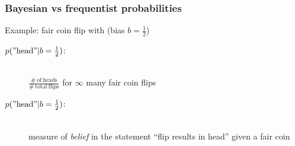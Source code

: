 \documentclass[t,aspectratio=169]{beamer}
\begin{document}
\begin{frame}
  \frametitle{Bayesian vs frequentist probabilities}
  Example: fair coin flip with (bias $b=\frac{1}{2}$)%
    \begin{tcolorbox}[title=Frequentist probability]
    \begin{description}
    \item[$p(\mathrm{"head"}|b=\frac{1}{2})$:] \hfill \\ $\frac{\mathrm{\# \ of \ heads}}{\mathrm{\# \ total \ flips}}$ for $\infty$ many fair coin flips
    \end{description}
  \end{tcolorbox}
  \begin{tcolorbox}[title=Bayesian probability]
    \begin{description}
    \item[$p(\mathrm{"head"}|b=\frac{1}{2})$:] \hfill \\ measure of \textit{belief} in the statement ``flip results in head'' given a fair coin
    \end{description}
  \end{tcolorbox}
\end{frame}
\end{document}
